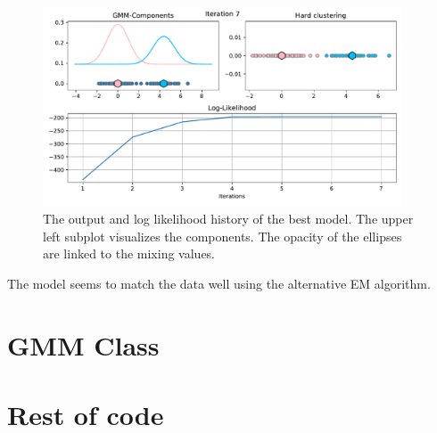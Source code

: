 \documentclass[12pt]{article}
\begin{document}
    \begin{figure}[H]
        \centering
        \includegraphics[width=0.95\textwidth]{GMM_task2.pdf}
        \caption{The output and log likelihood history of the best model. The upper left subplot visualizes the components. The opacity of the ellipses are linked to the mixing values.}
    \end{figure}
    The model seems to match the data well using the alternative EM algorithm.

    \appendix
    \section{GMM Class}
    \section{Rest of code}

% 
% 
% 
\end{document}
